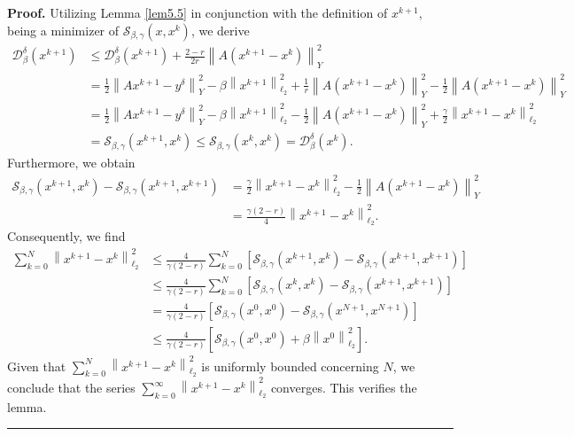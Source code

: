 \documentclass[a4paper,12pt]{article}
\numberwithin{equation}{section}
\newenvironment{proof}[1][Proof]{\textbf{#1.} }
{\ \rule{0.75em}{0.75em}\smallskip}
\begin{document}
\begin{proof}
    Utilizing Lemma \ref{lem5.5} in conjunction with the definition of $x^{k+1}$, being a minimizer of $\mathcal{S}_{\beta,\gamma}\left(x,x^{k}\right)$, we derive
    \begin{align*}
        \mathcal{D}_{\beta}^{\delta}\left(x^{k+1}\right)
        & \leq \mathcal{D}_{\beta}^{\delta}\left(x^{k+1}\right) +\frac{2-r}{2r}\left\|A\left(x^{k+1}-x^{k}\right)\right\|_{Y}^{2} \\
        & = \frac{1}{2}\left\|Ax^{k+1}-y^{\delta}\right\|_{Y}^{2}- \beta\left\|x^{k+1}\right\|_{\ell_{2}}^{2}+ \frac{1}{r}\left\|A\left(x^{k+1}-x^{k}\right)\right\|_{Y}^{2}- \frac{1}{2}\left\|A\left(x^{k+1}-x^{k}\right)\right\|_{Y}^{2} \\
        & = \frac{1}{2}\left\|Ax^{k+1}-y^{\delta}\right\|_{Y}^{2}- \beta\left\|x^{k+1}\right\|_{\ell_{2}}^{2}- \frac{1}{2}\left\|A\left(x^{k+1}-x^{k}\right)\right\|_{Y}^{2}+ \frac{\gamma}{2}\left\|x^{k+1}-x^{k}\right\|_{\ell_{2}}^{2} \\
        & = \mathcal{S}_{\beta,\gamma}\left(x^{k+1},x^{k}\right) 
        \leq \mathcal{S}_{\beta,\gamma}\left(x^{k},x^{k}\right)= \mathcal{D}_{\beta}^{\delta}\left(x^{k}\right).
    \end{align*}
    Furthermore, we obtain
    \begin{align*}
        \mathcal{S}_{\beta,\gamma}\left(x^{k+1},x^{k}\right)- \mathcal{S}_{\beta,\gamma}\left(x^{k+1},x^{k+1}\right)
        & = \frac{\gamma}{2}\left\|x^{k+1}-x^{k}\right\|_{\ell_{2}}^{2} -\frac{1}{2}\left\|A\left(x^{k+1}-x^{k}\right)\right\|_{Y}^{2} \\
        & = \frac{\gamma\left(2-r\right)}{4} \left\|x^{k+1}-x^{k}\right\|_{\ell_{2}}^{2}. 
    \end{align*}
    Consequently, we find
    \begin{align*}
        \sum_{k=0}^{N}\left\|x^{k+1}-x^{k}\right\|_{\ell_{2}}^{2}
        & \leq \frac{4}{\gamma\left(2-r\right)}\sum_{k=0}^{N} \left[\mathcal{S}_{\beta,\gamma}\left(x^{k+1},x^{k}\right)- \mathcal{S}_{\beta,\gamma}\left(x^{k+1},x^{k+1}\right)\right]  \\
        & \leq \frac{4}{\gamma\left(2-r\right)}\sum_{k=0}^{N} \left[\mathcal{S}_{\beta,\gamma}\left(x^{k},x^{k}\right)- \mathcal{S}_{\beta,\gamma}\left(x^{k+1},x^{k+1}\right)\right] \\
        & = \frac{4}{\gamma\left(2-r\right)} \left[\mathcal{S}_{\beta,\gamma}\left(x^{0},x^{0}\right)- \mathcal{S}_{\beta,\gamma}\left(x^{N+1},x^{N+1}\right)\right] \\
        & \leq \frac{4}{\gamma\left(2-r\right)} \left[\mathcal{S}_{\beta,\gamma}\left(x^{0},x^{0}\right)+ \beta\left\|x^{0}\right\|_{\ell_{2}}^{2}\right].
    \end{align*}
    Given that $\sum_{k=0}^{N}\left\|x^{k+1}-x^{k}\right\|_{\ell_{2}}^{2}$ is uniformly bounded concerning $N$, we conclude that the series $\sum_{k=0}^{\infty}\left\|x^{k+1}-x^{k}\right\|_{\ell_{2}}^{2}$ converges. This verifies the lemma.
\end{proof}
\end{document}
